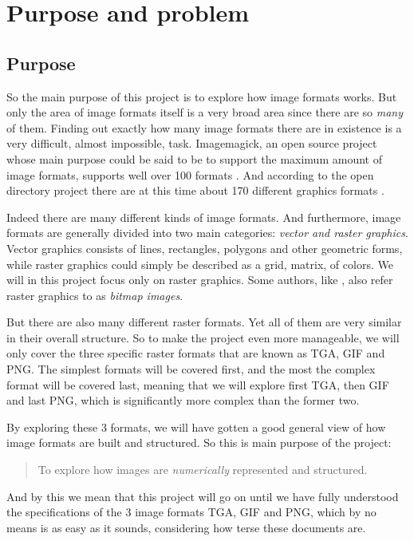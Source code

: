 \begin{comment}
  
\end{comment}

\chapter{Purpose and problem}

\section{Purpose}

So the main purpose of this project is to explore how image formats
works. But only the area of image formats itself is a very broad area
since there are so \textit{many} of them. Finding out exactly how
many image formats there are in existence is a very difficult, almost
impossible, task. Imagemagick, an open source project whose main purpose
could be said to be to support the maximum amount of image formats,
supports well over 100 formats \cite{11:imagemagick_home}. And
according to the open directory project there are at this time about
170 different graphics formats \cite{10:opendirectory_data_formats}.

Indeed there are many different kinds of image formats. And
furthermore, image formats are generally divided into two main
categories: \textit{vector and raster
  graphics}\cite{murray1996encyclopedia,roelofs99:_png}. Vector
graphics consists of lines, rectangles, polygons and other geometric
forms, while raster graphics could simply be described as a grid,
matrix, of colors. We will in this project focus only on raster
graphics. Some authors, like \cite{murray1996encyclopedia}, also refer
raster graphics to as \textit{bitmap images}.

But there are also many different raster formats. Yet all of them are
very similar in their overall structure. So to make the project even
more manageable, we will only cover the three specific raster formats
that are known as TGA, GIF and PNG. The simplest formats will be
covered first, and the most the complex format will be covered last,
meaning that we will explore first TGA, then GIF and last PNG, which is
significantly more complex than the former two.

By exploring these 3 formats, we will have gotten a good general view
of how image formats are built and structured. So this is main purpose
of the project:

\begin{quote}
  To explore how images are \textit{numerically} represented and
  structured.
\end{quote}

And by this we mean that this project will go on until we have fully
understood the specifications of the 3 image formats TGA, GIF and PNG,
which by no means is as easy as it sounds, considering how terse these
documents are.

